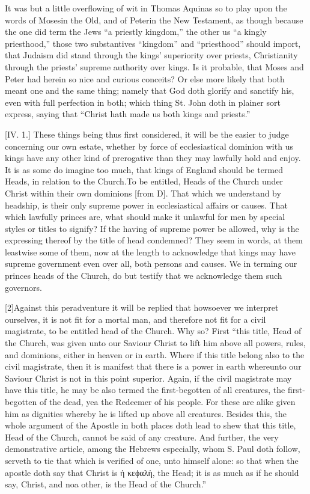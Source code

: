 It was but a little overflowing of wit in Thomas Aquinas so to play upon the words of Mosesin the Old, and of Peterin the New Testament, as though because the one did term the Jews “a priestly kingdom,” the other us “a kingly priesthood,” those two substantives “kingdom” and “priesthood” should import, that Judaism did stand through the kings’ superiority over priests, Christianity through the priests’ supreme authority over kings. Is it probable, that Moses and Peter had herein so nice and curious conceits? Or else more likely that both meant one and the same thing; namely that God doth glorify and sanctify his, even with full perfection in both; which thing St. John doth in plainer sort express, saying that “Christ hath made us both kings and priests.”


[IV. 1.] These things being thus first considered, it will be the easier to judge concerning our own estate, whether by force of ecclesiastical dominion with us kings have any other kind of prerogative than they may lawfully hold and enjoy. It is as some do imagine too much, that kings of England should be termed Heads, in relation to the Church.To be entitled, Heads of the Church under Christ within their own dominions [from D]. That which we understand by headship, is their only supreme power in ecclesiastical affairs or causes. That which lawfully princes are, what should make it unlawful for men by special styles or titles to signify? If the having of supreme power be allowed, why is the expressing thereof by the title of head condemned? They seem in words, at them leastwise some of them, now at the length to acknowledge that kings may have supreme government even over all, both persons and causes. We in terming our princes heads of the Church, do but testify that we acknowledge them such governors.

[2]Against this peradventure it will be replied that  howsoever we interpret ourselves, it is not fit for a mortal man, and therefore not fit for a civil magistrate, to be entitled head of the Church. Why so? First “this title, Head of the Church, was given unto our Saviour Christ to lift him above all powers, rules, and dominions, either in heaven or in earth. Where if this title belong also to the civil magistrate, then it is manifest that there is a power in earth whereunto our Saviour Christ is not in this point superior. Again, if the civil magistrate may have this title, he may be also termed the first-begotten of all creatures, the first-begotten of the dead, yea the Redeemer of his people. For these are alike given him as dignities whereby he is lifted up above all creatures. Besides this, the whole argument of the Apostle in both places doth lead to shew that this title, Head of the Church, cannot be said of any creature. And further, the very demonstrative article, among the Hebrews especially, whom S. Paul doth follow, serveth to tie that which is verified of one, unto himself alone: so that when the apostle doth say that Christ is  ἡ κεϕαλὴ, the Head; it is as much as if he should say, Christ, and noa other, is the Head of the Church.”

